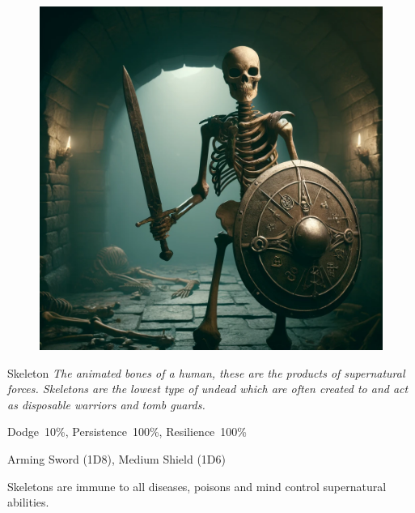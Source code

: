 \begin{figure}[h]
\begin{center}
\includegraphics[scale=0.24]{img/ai-images/skeleton.png}
\end{center}
\end{figure}
\begin{monsterbox}{Skeleton}
	\textit{The animated bones of a human, these are the products of supernatural forces. Skeletons are the lowest type of undead which are often created to and act as disposable warriors and tomb guards.}\\
	\rpghline
	\basics[%
        hitpoints  = 8, 
	majorwound = 4,
	damagemodifier = 0,
	powerpoints = 0,
	movementrate = 15m,
	armor = Leather (2AP),
	plunderrating = 0
	]
	\rpghline%
	\stats[ %
		STR = 2D6+6 (13),
		CON = 1D6   (4),
		DEX = 3D6   (11),
		SIZ = 3D6   (11),
		INT = 0     (0),
		POW = 0     (0),
		CHA = 0     (0)
	]
	\rpghline%
	\begin{rpg-monsteraction}[Resistances]
		Dodge~10\%, Persistence~100\%, Resilience~100\%
	\end{rpg-monsteraction}
	\begin{rpg-monsteraction}
		Arming Sword (1D8), Medium Shield (1D6)
	\end{rpg-monsteraction}
	\begin{rpg-monsteraction}[Immunities]
		Skeletons are immune to all diseases, poisons and mind control supernatural abilities.
	\end{rpg-monsteraction}

\end{monsterbox}

